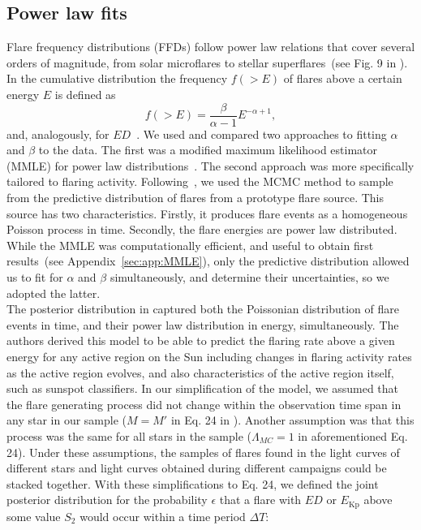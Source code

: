 \documentclass{aa}
\begin{document}
\subsection{Power law fits}
\label{powerlawfits}
Flare frequency distributions (FFDs) follow power law relations that cover several orders of magnitude, from solar microflares to stellar superflares~(see Fig. 9 in \citealt{shibayama2013}). In the cumulative distribution the frequency $f(>E)$ of flares above a certain energy $E$ is defined as
\begin{equation}
f(>E) = \dfrac{\beta}{\alpha - 1}E^{-\alpha + 1},
\label{eqn:cumdist}
\end{equation}
and, analogously, for $ED$~\citep{gershberg1972}. We used and compared two approaches to fitting $\alpha$ and $\beta$ to the data. The first was a modified maximum likelihood estimator (MMLE) for power law distributions~\citep{maschberger2009}. The second approach was more specifically tailored to flaring activity. Following~\citet{wheatland_flaresbayes_2004}, we used the MCMC method to sample from the predictive distribution of flares from a prototype flare source. This source has two characteristics. Firstly, it produces flare events as a homogeneous Poisson process in time. Secondly, the flare energies are power law distributed. While the MMLE was computationally efficient, and useful to obtain first results~(see Appendix~\ref{sec:app:MMLE}), only the predictive distribution allowed us to fit for $\alpha$ and $\beta$ simultaneously, and determine their uncertainties, so we adopted the latter.
\\
The posterior distribution in \citet{wheatland_flaresbayes_2004} captured both the Poissonian distribution of flare events in time, and their power law distribution in energy, simultaneously. The authors derived this model to be able to predict the flaring rate above a given energy for any active region on the Sun including changes in flaring activity rates as the active region evolves, and also characteristics of the active region itself, such as sunspot classifiers. In our simplification of the model, we assumed that the flare generating process did not change within the observation time span in any star in our sample ($M=M'$ in Eq. 24 in \citealt{wheatland_flaresbayes_2004}). Another assumption was that this process was the same for all stars in the sample ($\Lambda_{MC}=1$ in aforementioned Eq. 24). Under these assumptions, the samples of flares found in the light curves of different stars and light curves obtained during different campaigns could be stacked together. With these simplifications to Eq. 24, we defined the joint posterior distribution for the probability $\epsilon$ that a flare with $ED$ or $E_\mathrm{Kp}$ above some value $S_2$ would occur within a time period $\Delta T$:
\end{document}
